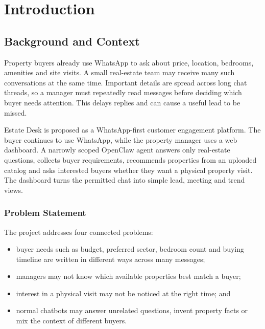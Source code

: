 \documentclass{tietreport}
\author{%
  \texttt{1024240140} Aman Kapoor \\
  \texttt{1024240020} Vidushi Jain%
}
\begin{document}
\raggedbottom
\maketitle
\tableofcontents

\chapter{Introduction}

\section{Background and Context}

Property buyers already use WhatsApp to ask about price, location, bedrooms,
amenities and site visits. A small real-estate team may receive many such
conversations at the same time. Important details are spread across long chat
threads, so a manager must repeatedly read messages before deciding which buyer
needs attention. This delays replies and can cause a useful lead to be missed.

Estate Desk is proposed as a WhatsApp-first customer engagement platform. The
buyer continues to use WhatsApp, while the property manager uses a web
dashboard. A narrowly scoped OpenClaw agent answers only real-estate questions,
collects buyer requirements, recommends properties from an uploaded catalog and
asks interested buyers whether they want a physical property visit. The
dashboard turns the permitted chat into simple lead, meeting and trend views.

\subsection{Problem Statement}

The project addresses four connected problems:

\begin{itemize}
  \item buyer needs such as budget, preferred sector, bedroom count and buying
    timeline are written in different ways across many messages;
  \item managers may not know which available properties best match a buyer;
  \item interest in a physical visit may not be noticed at the right time; and
  \item normal chatbots may answer unrelated questions, invent property facts or
    mix the context of different buyers.
\end{itemize}
\end{document}
